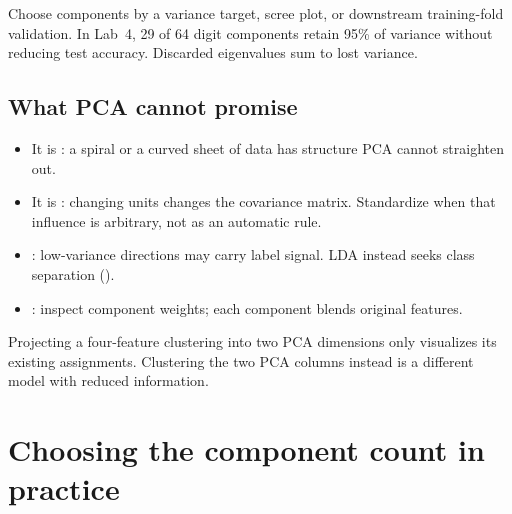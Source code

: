 \begin{mlfigure}
\end{mlfigure}

Choose components by a variance target, scree plot, or downstream training-fold validation. In Lab~4, 29 of 64 digit components retain 95\% of variance without reducing test accuracy. Discarded eigenvalues sum to lost variance.

\subsection{What PCA cannot promise}
\label{sec:pca-limitations}

\begin{itemize}
  \item It is : a spiral or a curved sheet of data has structure PCA cannot straighten out.
  \item It is : changing units changes the covariance matrix. Standardize when that influence is arbitrary, not as an automatic rule.
  \item {}: low-variance directions may carry label signal. LDA instead seeks class separation ().
  \item {}: inspect component weights; each component blends original features.
\end{itemize}

\begin{pitfall}
Projecting a four-feature clustering into two PCA dimensions only visualizes its existing assignments. Clustering the two PCA columns instead is a different model with reduced information.
\end{pitfall}

\section{Choosing the component count in practice}

